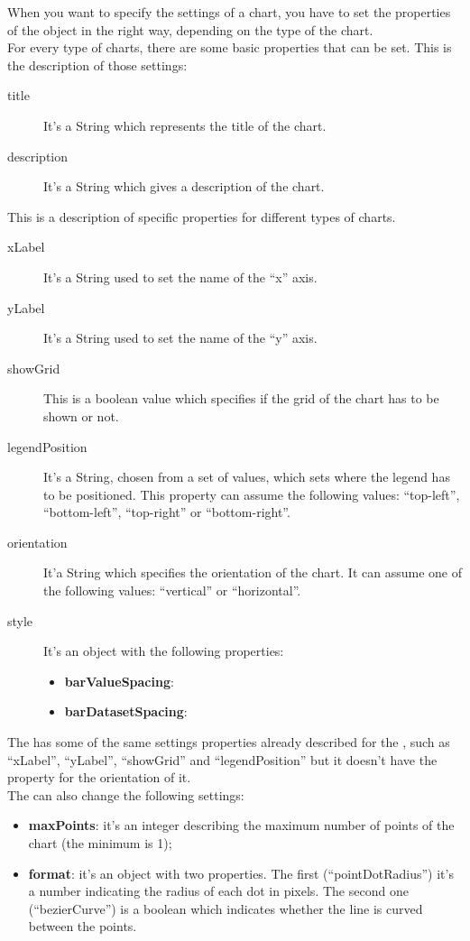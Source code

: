 		When you want to specify the settings of a chart, you have to set the properties of the  object in the right way, depending on the type of the chart.\\
		For every type of charts, there are some basic properties that can be set. This is the description of those settings:
		\begin{description}
			\item[title] It's a String which represents the title of the chart.
			\item[description] It's a String which gives a description of the chart.
		\end{description}
		This is a description of specific properties for different types of charts.
			\begin{description}
				\item[xLabel] It's a String used to set the name of the “x” axis.
				\item[yLabel] It's a String used to set the name of the “y” axis.
				\item[showGrid] This is a boolean value which specifies if the grid of the chart has to be shown or not.
				\item[legendPosition] It's a String, chosen from a set of values, which sets where the legend has to be positioned. This property can assume the following values: “top-left”, “bottom-left”, “top-right” or “bottom-right”.
				\item[orientation] It'a String which specifies the orientation of the chart. It can assume one of the following values: “vertical” or “horizontal”.
				\item[style] It's an object with the following properties:
				\begin{itemize}
					\item \textbf{barValueSpacing}: 
					\item \textbf{barDatasetSpacing}:
				\end{itemize}
			\end{description}
			The  has some of the same settings properties already described for the , such as “xLabel”, “yLabel”, “showGrid” and “legendPosition” but it doesn't have the property for the orientation of it. \\
			The  can also change the following settings:
			\begin{itemize}
				\item \textbf{maxPoints}: it's an integer describing the maximum number of points of the chart (the minimum is 1);
				\item \textbf{format}: it's an object with two properties. The first (“pointDotRadius”) it's a number indicating the radius of each dot in pixels. The second one (“bezierCurve”) is a boolean which indicates whether the line is curved between the points.
			\end{itemize}
